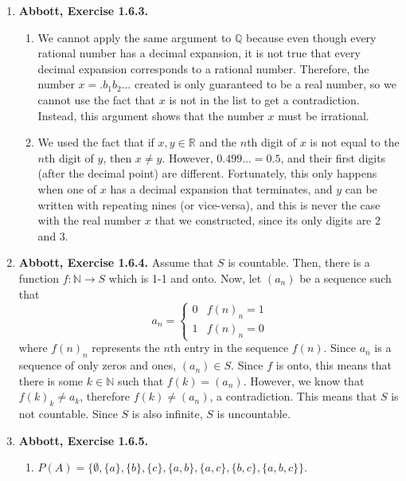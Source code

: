\documentclass{article}
\newcommand{\N}{\mathbb{N}}
\newcommand{\Q}{\mathbb{Q}}
\newcommand{\R}{\mathbb{R}}
\newcommand{\exc}[2][Abbott]{\item \textbf{#1, Exercise #2.}}
\begin{document}
\begin{enumerate}
	\exc{1.6.3}
				      	          
	\begin{enumerate}
		\item We cannot apply the same argument to $\Q$ because even though every rational number has a decimal expansion, it is not true that every decimal expansion corresponds to a rational number. Therefore, the number $x = .b_1b_2 \dots$ created is only guaranteed to be a real number, so we cannot use the fact that $x$ is not in the list to get a contradiction. Instead, this argument shows that the number $x$ must be irrational.
		      		      		      	      	      	      	              
		\item We used the fact that if $x, y \in \R$ and the $n$th digit of $x$ is not equal to the $n$th digit of $y$, then $x \neq y$. However, $0.499\dots = 0.5$, and their first digits (after the decimal point) are different. Fortunately, this only happens when one of $x$ has a decimal expansion that terminates, and $y$ can be written with repeating nines (or vice-versa), and this is never the case with the real number $x$ that we constructed, since its only digits are $2$ and $3$. 
	\end{enumerate}
				      	          
	\exc{1.6.4}
	Assume that $S$ is countable. Then, there is a function $f : \N \rightarrow S$ which is 1-1 and onto. Now, let $(a_n)$ be a sequence such that \begin{equation*}
	a_n = \begin{cases}
	0 & f(n)_n = 1 \\ 
	1 & f(n)_n = 0
	\end{cases}
	\end{equation*}
	where $f(n)_n$ represents the $n$th entry in the sequence $f(n)$. Since $a_n$ is a sequence of only zeros and ones, $(a_n) \in S$. Since $f$ is onto, this means that there is some $k \in \N$ such that $f(k) = (a_n)$. However, we know that $f(k)_k \neq a_k$, therefore $f(k) \neq (a_n)$, a contradiction. This means that $S$ is not countable. Since $S$ is also infinite, $S$ is uncountable.
					    
	\exc{1.6.5}
				      	          
	\begin{enumerate}
		\item $P(A) = \{\emptyset, \{a\}, \{b\}, \{c\}, \{a, b\}, \{a, c\}, \{b, c\}, \{a, b, c\}\}$.
		      		      		      	      	      	      	              

\end{enumerate}
\end{enumerate}
\end{document}
